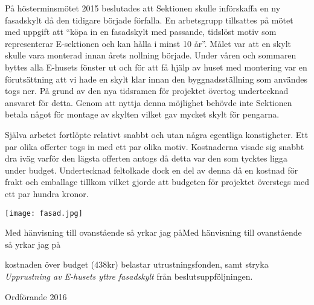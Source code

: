 \documentclass[../_main/handlingar.tex]{subfiles}
\begin{document}

På hösterminsmötet 2015 beslutades att Sektionen skulle införskaffa en ny fasadskylt då den tidigare började förfalla. En arbetsgrupp tillsattes på mötet med uppgift att “köpa in en fasadskylt med passande, tidslöst motiv som representerar E-sektionen och kan hålla i minst 10 år”. Målet var att en skylt skulle vara monterad innan årets nollning började. Under våren och sommaren byttes alla E-husets fönster ut och för att få hjälp av huset med montering var en förutsättning att vi hade en skylt klar innan den byggnadsställning som användes togs ner. På grund av den nya tidsramen för projektet övertog undertecknad ansvaret för detta. Genom att nyttja denna möjlighet behövde inte Sektionen betala något för montage av skylten vilket gav mycket skylt för pengarna.

Själva arbetet fortlöpte relativt snabbt och utan några egentliga konstigheter. Ett par olika offerter togs in med ett par olika motiv. Kostnaderna visade sig snabbt dra iväg varför den lägsta offerten antogs då detta var den som tycktes ligga under budget. Undertecknad feltolkade dock en del av denna då en kostnad för frakt och emballage tillkom vilket gjorde att budgeten för projektet överstegs med ett par hundra kronor.

\begin{center}
\texttt{[image: fasad.jpg]}
\end{center}

Med hänvisning till ovanstående så yrkar jag påMed hänvisning till ovanstående så yrkar jag på

\begin{attsatser}
    \att kostnaden över budget (438kr) belastar utrustningsfonden, samt
    \att stryka \emph{Upprustning av E-husets yttre fasadskylt} från beslutsuppföljningen.
\end{attsatser}

\begin{signatures}{1}
    \mvh
    \signature{Fredrik Peterson}{Ordförande 2016}
\end{signatures}
\end{document}
